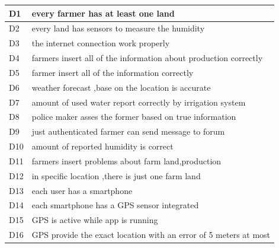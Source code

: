 \begin{table}[H]
\begin{tabular}{|m{2cm}|l|}
\hline
\normalsize	

D1 & every farmer has at least one land

\\\hline
D2 & every land has sensors to measure the humidity      \\\hline
D3 & the internet connection work properly\\\hline
D4 & farmers insert all of the information about production correctly \\\hline
D5 & farmer insert all of the information correctly \\\hline
D6 & weather forecast ,base on the location is accurate \\\hline
D7 & amount of used water report correctly by irrigation system\\\hline
D8 & police maker asses the former based on true information\\\hline
D9 & just authenticated farmer can send message to forum \\\hline
D10 & amount of reported humidity is correct \\\hline
D11 & farmers insert problems about farm land,production  \\\hline
D12 & in specific location ,there is just one farm land \\\hline
D13 & each user has a smartphone \\\hline
D14 & each smartphone has a GPS sensor integrated  \\\hline 
D15 & GPS is active while app is running \\\hline
D16 & GPS provide the exact location  with an error  of 5 meters at most \\\hline

\hline
\end{tabular}
\end{table}

\clearpage
